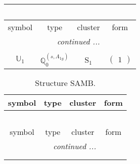 \documentclass[fleqn,10pt,landscape]{article}
\begin{document}
\begin{itemize}
\begin{center}
\begin{longtable}{c|c|c|c}
\multicolumn{3}{l}{\tablename\ \thetable{}} \\
 \hline \hline
symbol & type & cluster & form \\ \hline \endhead

 \hline \hline
\multicolumn{3}{r}{\footnotesize\it continued ...} \\ \endfoot

 \hline \hline
\multicolumn{3}{r}{} \\ \endlastfoot

$ \mathbb{U}_{1} $ & $\mathbb{Q}_{0}^{(s,A_{1g})}$ & S$_{1}$ & $\begin{pmatrix} 1 \end{pmatrix}$ \\
\end{longtable}
\end{center}
\begin{center}
\renewcommand{\arraystretch}{1.3}
\begin{longtable}{c|c|c|c}
\caption{Structure SAMB.}
 \\
 \hline \hline
symbol & type & cluster & form \\ \hline \endfirsthead

\multicolumn{3}{l}{\tablename\ \thetable{}} \\
 \hline \hline
symbol & type & cluster & form \\ \hline \endhead

 \hline \hline
\multicolumn{3}{r}{\footnotesize\it continued ...} \\ \endfoot

 \hline \hline
\multicolumn{3}{r}{} \\ \endlastfoot


\end{longtable}
\end{center}
\end{itemize}
\end{document}
